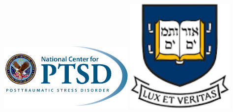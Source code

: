 \documentclass[]{betterposter}
\begin{document}
{\vfill

\begin{flushright}

\includegraphics[width=0.5\textwidth]{img/NCPTSD_Logo.png}
\hfill
\includegraphics[width=0.4\textwidth]{img/Yale.png}
\end{flushright}

}
\end{document}
